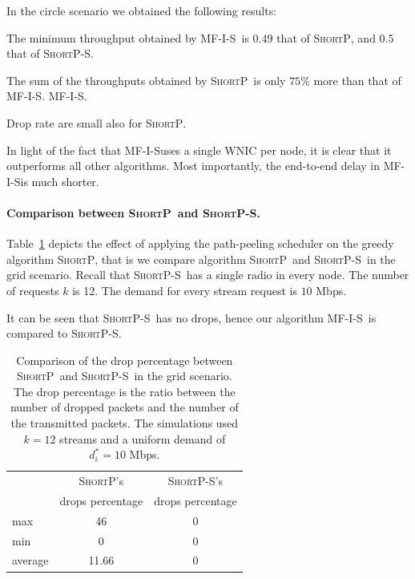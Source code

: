 \documentclass[12pt]{article}
\newenvironment{proof sketch}[1]{\noindent {\emph{Proof sketch of #1:}}}{\hfill \qed}
\newcommand{\PER}{\text{\sc{per}}}
\newcommand{\algA}{\textsc{MF-I-S}}
\newcommand{\algB}{\textsc{ShortP}}
\newcommand{\algBS}{\textsc{ShortP-S}}
\newcommand{\algE}{\textsc{MF-S}}
\begin{document}
In the circle scenario we obtained the following results:
\begin{inparaenum}[(1)]
\item The minimum throughput obtained by \algA\ is $0.49$ that of \algB, and $0.5$ that of \algBS.
\item The sum of the throughputs obtained by \algB\ is only $75$\% more than that of
  \algA.
  \algA.
\item Drop rate are small also for \algB.
\end{inparaenum}

In light of the fact that \algA uses a single WNIC per node, it is
clear that it outperforms all other algorithms. Most importantly, the
end-to-end delay in \algA is much shorter.

\paragraph{Comparison between \algB\ and \algBS.}
Table~\ref{tab:dropsBS} depicts the effect of applying the path-peeling scheduler on the greedy algorithm \algB, that is we compare algorithm \algB\ and \algBS\ in the grid scenario.
Recall that \algBS\ has a single radio in every node.
The number of requests $k$ is 12. The demand for every stream request is $10$ Mbps.

It can be seen that \algBS\ has no drops, hence our algorithm \algA\ is compared to \algBS.
\begin{table}
\centering\small
\begin{tabular}{|| l || c | c ||}

\hline
 & \algB 's            & \algBS 's \\
    &  drops percentage   & drops percentage \\
\hline\hline
max     & 46 & 0  \\
min     & 0 & 0 \\
average & 11.66  & 0 \\
\hline
\end{tabular}
\caption{
  Comparison of the drop percentage between \algB\ and \algBS\ in the grid scenario. The drop percentage is
  the ratio between the number of
  dropped packets and the number of the transmitted packets. The simulations used $k=12$ streams and a uniform demand of $d_i^*=10$ Mbps.}
\label{tab:dropsBS}
\end{table}
\end{document}
